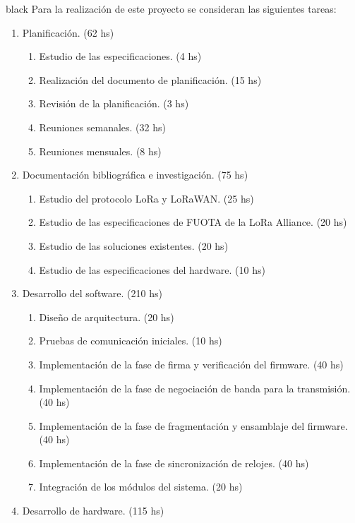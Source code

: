 \documentclass[11pt]{charter}
\begin{document}
\begin{consigna}{black}
Para la realización de este proyecto se consideran las siguientes tareas:

\begin{enumerate}
	\item Planificación. \hfill(62 hs)
	\begin{enumerate}
		\item Estudio de las especificaciones. \hfill(4 hs)
		\item Realización del documento de planificación. \hfill(15 hs)
		\item Revisión de la planificación. \hfill(3 hs)
		\item Reuniones semanales. \hfill(32 hs)
		\item Reuniones mensuales. \hfill(8 hs)
	\end{enumerate}
	\item Documentación bibliográfica e investigación. (75 hs)
	\begin{enumerate}
		\item Estudio del protocolo LoRa y LoRaWAN. \hfill(25 hs)
		\item Estudio de las especificaciones de FUOTA de la LoRa Alliance\textregistered. \hfill(20 hs)
		\item Estudio de las soluciones existentes. \hfill(20 hs)
		\item Estudio de las especificaciones del hardware. \hfill(10 hs)
	\end{enumerate}
	\item Desarrollo del software. \hfill(210 hs)
	\begin{enumerate}
		\item Diseño de arquitectura. \hfill(20 hs)
		\item Pruebas de comunicación iniciales. \hfill(10 hs)
		\item Implementación de la fase de firma y verificación del firmware. \hfill(40 hs)
		\item Implementación de la fase de negociación de banda para la transmisión. \hfill(40 hs)
		\item Implementación de la fase de fragmentación y ensamblaje del firmware. \hfill(40 hs)
		\item Implementación de la fase de sincronización de relojes. \hfill(40 hs)
		\item Integración de los módulos del sistema. \hfill(20 hs)
	\end{enumerate}
    \item Desarrollo de hardware. \hfill(115 hs)

\end{enumerate}
\end{consigna}
\end{document}

